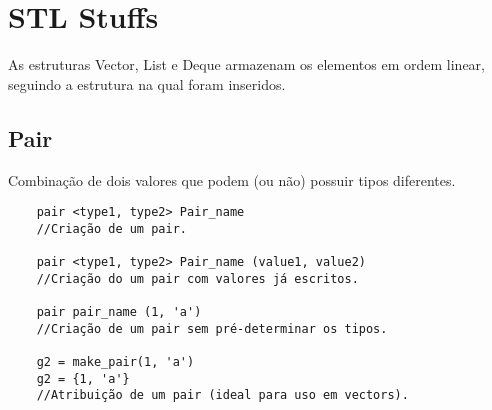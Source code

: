 \section{STL Stuffs}
As estruturas Vector, List e Deque armazenam os elementos em ordem linear,
seguindo a estrutura na qual foram inseridos.

\subsection{Pair}
Combinação de dois valores que podem (ou não) possuir tipos diferentes.
\begin{verbatim}
    pair <type1, type2> Pair_name 
    //Criação de um pair.

    pair <type1, type2> Pair_name (value1, value2) 
    //Criação do um pair com valores já escritos.

    pair pair_name (1, 'a') 
    //Criação de um pair sem pré-determinar os tipos.

    g2 = make_pair(1, 'a')
    g2 = {1, 'a'}
    //Atribuição de um pair (ideal para uso em vectors).
\end{verbatim}

